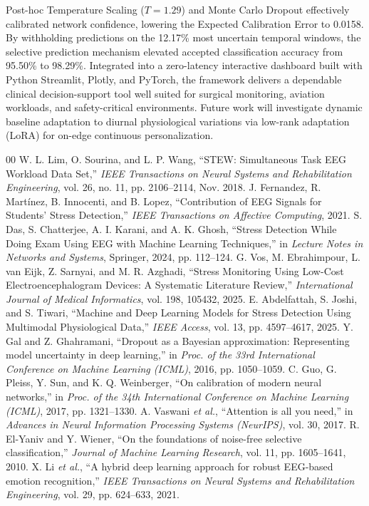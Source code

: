 \documentclass[conference,a4paper]{IEEEtran}
\begin{document}
Post-hoc Temperature Scaling ($T = 1.29$) and Monte Carlo Dropout effectively calibrated network confidence, lowering the Expected Calibration Error to 0.0158. By withholding predictions on the 12.17\% most uncertain temporal windows, the selective prediction mechanism elevated accepted classification accuracy from 95.50\% to 98.29\%. Integrated into a zero-latency interactive dashboard built with Python Streamlit, Plotly, and PyTorch, the framework delivers a dependable clinical decision-support tool well suited for surgical monitoring, aviation workloads, and safety-critical environments. Future work will investigate dynamic baseline adaptation to diurnal physiological variations via low-rank adaptation (LoRA) for on-edge continuous personalization.
\begin{thebibliography}{00}
 W. L. Lim, O. Sourina, and L. P. Wang, ``STEW: Simultaneous Task EEG Workload Data Set,'' \textit{IEEE Transactions on Neural Systems and Rehabilitation Engineering}, vol. 26, no. 11, pp. 2106--2114, Nov. 2018.
 J. Fernandez, R. Mart{\'i}nez, B. Innocenti, and B. Lopez, ``Contribution of EEG Signals for Students' Stress Detection,'' \textit{IEEE Transactions on Affective Computing}, 2021.
 S. Das, S. Chatterjee, A. I. Karani, and A. K. Ghosh, ``Stress Detection While Doing Exam Using EEG with Machine Learning Techniques,'' in \textit{Lecture Notes in Networks and Systems}, Springer, 2024, pp. 112--124.
 G. Vos, M. Ebrahimpour, L. van Eijk, Z. Sarnyai, and M. R. Azghadi, ``Stress Monitoring Using Low-Cost Electroencephalogram Devices: A Systematic Literature Review,'' \textit{International Journal of Medical Informatics}, vol. 198, 105432, 2025.
 E. Abdelfattah, S. Joshi, and S. Tiwari, ``Machine and Deep Learning Models for Stress Detection Using Multimodal Physiological Data,'' \textit{IEEE Access}, vol. 13, pp. 4597--4617, 2025.
 Y. Gal and Z. Ghahramani, ``Dropout as a Bayesian approximation: Representing model uncertainty in deep learning,'' in \textit{Proc. of the 33rd International Conference on Machine Learning (ICML)}, 2016, pp. 1050--1059.
 C. Guo, G. Pleiss, Y. Sun, and K. Q. Weinberger, ``On calibration of modern neural networks,'' in \textit{Proc. of the 34th International Conference on Machine Learning (ICML)}, 2017, pp. 1321--1330.
 A. Vaswani \textit{et al.}, ``Attention is all you need,'' in \textit{Advances in Neural Information Processing Systems (NeurIPS)}, vol. 30, 2017.
 R. El-Yaniv and Y. Wiener, ``On the foundations of noise-free selective classification,'' \textit{Journal of Machine Learning Research}, vol. 11, pp. 1605--1641, 2010.
 X. Li \textit{et al.}, ``A hybrid deep learning approach for robust EEG-based emotion recognition,'' \textit{IEEE Transactions on Neural Systems and Rehabilitation Engineering}, vol. 29, pp. 624--633, 2021.
\end{thebibliography}
\end{document}
